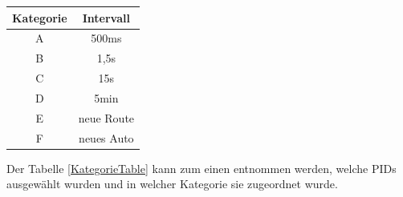 		\begin{center}
			\begin{tabular}{|c|c|}
				\hline 
				Kategorie & Intervall \\ 
				\hline 
				A & 500ms \\ 
				\hline 
				B & 1,5s \\ 
				\hline 
				C & 15s \\ 
				\hline 
				D & 5min \\ 
				\hline 
				E & neue Route \\ 
				\hline 
				F & neues Auto \\ 
				\hline 
			\end{tabular} 
			\label{KategorieTable}		
		\end{center}

		
		Der Tabelle \ref{KategorieTable} kann zum einen entnommen werden, welche \acp{PID} ausgewählt wurden und in welcher Kategorie sie zugeordnet wurde.
		
